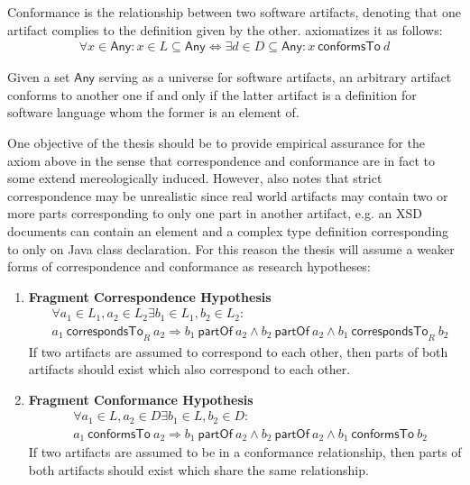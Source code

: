 \documentclass[runningheads,a4paper]{llncs}
\newcommand{\Any}{\textsf{Any}}
\newcommand{\partOf}{~\textsf{partOf}~}
\newcommand{\correspondsToR}[1]{~\textsf{correspondsTo}_{#1}~}
\newcommand{\conformsTo}{~\textsf{conformsTo}~}
\begin{document}
Conformance is the relationship between two software artifacts, denoting that one artifact complies to the definition given by the other.
\cite{DBLP:conf/sle/Lammel16} axiomatizes it as follows:
\begin{align*}
\forall x \in \Any :
x \in L \subseteq \Any \Leftrightarrow \exists d \in D \subseteq \Any : x \conformsTo d
\end{align*}

Given a set $\Any$ serving as a universe for software artifacts, an arbitrary artifact conforms to another one if and only if the latter artifact is a definition for software language whom the former is an element of.

One objective of the thesis should be to provide empirical assurance for the axiom above in the sense that correspondence and conformance are in fact to some extend mereologically induced.
However, \cite{DBLP:conf/sle/Lammel16} also notes that strict correspondence may be unrealistic since real world artifacts may contain two or more parts corresponding to only one part in another artifact, e.g. an XSD documents can contain an element and a complex type definition corresponding to only on Java class declaration.
For this reason the thesis will assume a weaker forms of correspondence and conformance as research hypotheses:
\begin{enumerate}[RH1]
\item
\textbf{Fragment Correspondence Hypothesis}
\begin{align*}
&\forall a_1 \in L_1, a_2 \in L_2 \exists b_1 \in L_1, b_2 \in L_2 :  
\\&a_1 \correspondsToR{R} a_2
\Rightarrow 
b_1 \partOf a_2 
\wedge b_2 \partOf a_2
\wedge b_1 \correspondsToR{R} b_2
\end{align*}
If two artifacts are assumed to correspond to each other, then parts of both artifacts should exist which also correspond to each other.

\item
\textbf{Fragment Conformance Hypothesis}
\begin{align*}
&\forall a_1 \in L, a_2 \in D \exists b_1 \in L, b_2 \in D : 
\\&a_1 \conformsTo a_2
\Rightarrow 
b_1 \partOf a_2
\wedge b_2 \partOf a_2
\wedge b_1 \conformsTo b_2
\end{align*}
If two artifacts are assumed to be in a conformance relationship, then parts of both artifacts should exist which share the same relationship.
\end{enumerate}
\end{document}
